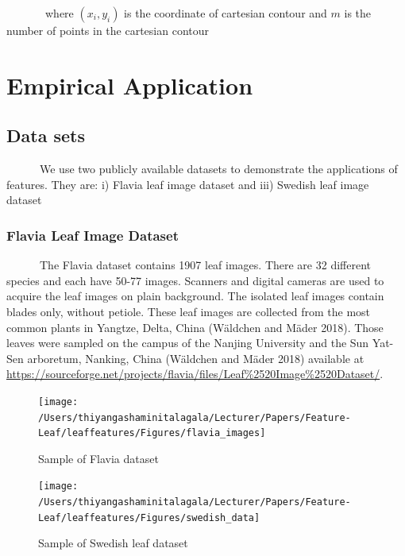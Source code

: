 \documentclass{article}
\begin{document}
~~~~~~~where \((x_i,y_i)\) is the coordinate of cartesian contour and
\(m\) is the number of points in the cartesian contour

\hypertarget{empirical-application}{%
\section{Empirical Application}\label{empirical-application}}

\hypertarget{data-sets}{%
\subsection{Data sets}\label{data-sets}}

~~~~~~We use two publicly available datasets to demonstrate the
applications of features. They are: i) Flavia leaf image dataset and
iii) Swedish leaf image dataset

\hypertarget{flavia-leaf-image-dataset}{%
\subsubsection{Flavia Leaf Image
Dataset}\label{flavia-leaf-image-dataset}}

~~~~~~The Flavia dataset contains 1907 leaf images. There are 32
different species and each have 50-77 images. Scanners and digital
cameras are used to acquire the leaf images on plain background. The
isolated leaf images contain blades only, without petiole. These leaf
images are collected from the most common plants in Yangtze, Delta,
China (Wäldchen and Mäder 2018). Those leaves were sampled on the campus
of the Nanjing University and the Sun Yat-Sen arboretum, Nanking, China
(Wäldchen and Mäder 2018) available at
\url{https://sourceforge.net/projects/flavia/files/Leaf%2520Image%2520Dataset/}.

\begin{figure}[!ht]

{\centering \texttt{[image: /Users/thiyangashaminitalagala/Lecturer/Papers/Feature-Leaf/leaffeatures/Figures/flavia\_images]} 

}

\caption{\label{slp1}Sample of Flavia dataset}\label{fig:unnamed-chunk-35}
\end{figure}

\begin{figure}[!ht]

{\centering \texttt{[image: /Users/thiyangashaminitalagala/Lecturer/Papers/Feature-Leaf/leaffeatures/Figures/swedish\_data]} 

}

\caption{\label{slp2}Sample of Swedish leaf dataset}\label{fig:unnamed-chunk-36}
\end{figure}
\end{document}
